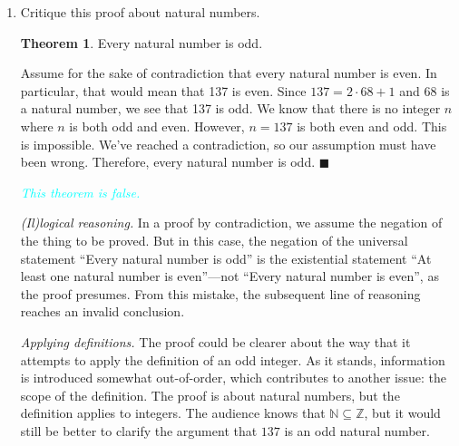 \documentclass{article}
\renewcommand{\(}{\left(}
\renewcommand{\)}{\right)}
\renewcommand\qedsymbol{$\blacksquare$}
\newenvironment{prf}{{\bfseries Proof.}}{\qedsymbol}
\theoremstyle{plain}
\theoremstyle{plain}
\theoremstyle{definition}
\newtheorem*{thm}{Theorem}
\begin{document}
\begin{enumerate}[label*=\roman*.,ref=\roman*]
\begin{shaded}
\begin{proof}[Revised proof.]
    	Since $n$ is odd, we know that it can be expressed as
    	\begin{equation}
    	n = 2r + 1
    	\end{equation}
    	for some integer $r$.
    	
    	Plugging in these expressions for $m$ and $n$, we learn that
    	\begin{equation}
    	\begin{aligned}
    	m + n &= 2k + 2r + 1 \\
    	&= 2(k + r) + 1.
    	\end{aligned}
    	\end{equation}
    	
    	So $m + n = 2s + 1$ for some integer $s$ (namely, $k + r$). Therefore, we have shown that $m + n$ is odd, as required.
    \end{proof}
    \end{shaded}

    \item Critique this proof about natural numbers.
    \begin{thm}
    Every natural number is odd.
    \end{thm}
    \begin{prf}
    Assume for the sake of contradiction that every natural number is even. In particular, that would mean that 137 is even. Since $137 = 2 \cdot 68 + 1$ and 68 is a natural number, we see that 137 is odd. We know that there is no integer $n$ where $n$ is both odd and even. However, $n = 137$ is both even and odd. This is impossible. We've reached a contradiction, so our assumption must have been wrong. Therefore, every natural number is odd.
    \end{prf}
    
    \begin{shaded}
    \textit{\textcolor{cyan}{This theorem is false.}}
    
    \textit{(Il)logical reasoning.} In a proof by contradiction, we assume the negation of the thing to be proved. But in this case, the negation of the universal statement ``Every natural number is odd'' is the existential statement ``At least one natural number is even''---not ``Every natural number is even'', as the proof presumes. From this mistake, the subsequent line of reasoning reaches an invalid conclusion.
    
    \textit{Applying definitions.} The proof could be clearer about the way that it attempts to apply the definition of an odd integer. As it stands, information is introduced somewhat out-of-order, which contributes to another issue: the scope of the definition. The proof is about natural numbers, but the definition applies to integers. The audience knows that $\mathbb{N} \subseteq \mathbb{Z}$, but it would still be better to clarify the argument that $137$ is an odd natural number.
    \end{shaded}


\end{enumerate}
\end{document}
